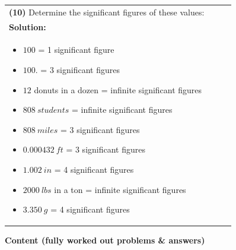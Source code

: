 \documentclass{article}
\begin{document}
\begin{tabular}{|p{0.9\linewidth}|}
\hline
\textbf{(10)} Determine the significant figures of these values: \\
\textbf{Solution:} \\
\begin{itemize}
    \item $100$ = 1 significant figure
    \item $100.$ = 3 significant figures
    \item $12$ donuts in a dozen = infinite significant figures
    \item $808~students$ = infinite significant figures
    \item $808~miles$ = 3 significant figures
    \item $0.000432~ft$ = 3 significant figures
    \item $1.002~in$ = 4 significant figures
    \item $2000~lbs$ in a ton = infinite significant figures
    \item $3.350~g$ = 4 significant figures
\end{itemize} \\
\hline
\end{tabular}





\newpage
\noindent
{\large \textbf{Content (fully worked out problems \& answers)}} \\[0.2em]
\end{document}
